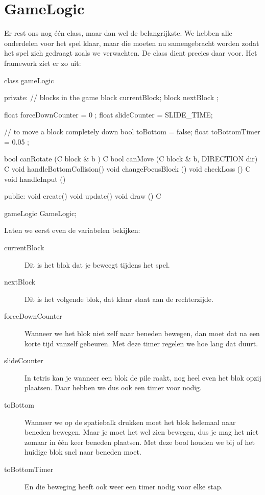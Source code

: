 \chapter{GameLogic}
Er rest ons nog \'e\'en class, maar dan wel de belangrijkste. We hebben alle onderdelen voor het spel klaar, maar die moeten nu samengebracht worden zodat het spel zich gedraagt zoals we verwachten. De class  dient precies daar voor. Het framework ziet er zo uit:

\begin{code}
class gameLogic
{
private:
   // blocks in the game
   block currentBlock;
   block nextBlock   ;

   float forceDownCounter = 0         ;
   float slideCounter     = SLIDE_TIME;
   
   // to move a block completely down
   bool  toBottom      = false;
   float toBottomTimer = 0.05 ; 
   
   
   bool canRotate            (C block & b               ) C {}
	 bool canMove              (C block & b, DIRECTION dir) C {}
   void handleBottomCollision()   {}   
   void changeFocusBlock     ()   {}    
   void checkLoss            () C {}
   void handleInput          ()   {}
    
public:
   void create()   {}
   void update()   {}
	 void draw  () C {}
} 
gameLogic GameLogic;
\end{code}

Laten we eerst even de variabelen bekijken:

\begin{description}
	\item[currentBlock] Dit is het blok dat je beweegt tijdens het spel.
	\item[nextBlock] Dit is het volgende blok, dat klaar staat aan de rechterzijde.
	\item[forceDownCounter] Wanneer we het blok niet zelf naar beneden bewegen, dan moet dat na een korte tijd vanzelf gebeuren. Met deze timer regelen we hoe lang dat duurt.
	\item[slideCounter] In tetris kan je wanneer een blok de pile raakt, nog heel even het blok opzij plaatsen. Daar hebben we dus ook een timer voor nodig.
	\item[toBottom] Wanneer we op de spatiebalk drukken moet het blok helemaal naar beneden bewegen. Maar je moet het wel zien bewegen, dus je mag het niet zomaar in \'e\'en keer beneden plaatsen. Met deze bool houden we bij of het huidige blok snel naar beneden moet.
	\item[toBottomTimer] En die beweging heeft ook weer een timer nodig voor elke stap.
\end{description}

